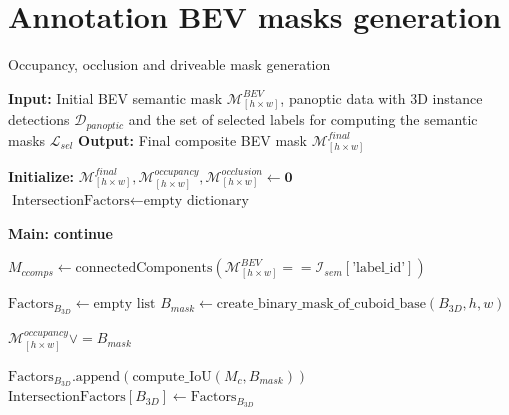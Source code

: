\section{Annotation BEV masks generation} \label{appendix:bev_masks_generation}
\begin{algorithm}
    \caption{Occupancy, occlusion and driveable mask generation}
    \label{algorithm:occ_masks}
    \footnotesize

    \begin{algorithmic}[1]
        \State \textbf{Input:} Initial BEV semantic mask $\mathcal{M}^{BEV}_{\left[h \times w\right]}$, panoptic data with 3D instance detections  $\mathcal{D}_{panoptic}$ and the set of selected labels for computing the semantic masks $\mathcal{L}_{sel}$
        \State \textbf{Output:} Final composite BEV mask $\mathcal{M}^{final}_{\left[h \times w\right]}$
        
        \State \textbf{Initialize:}
        \State $\mathcal{M}^{final}_{\left[h \times w\right]}, \mathcal{M}^{occupancy}_{\left[h \times w\right]}, \mathcal{M}^{occlusion}_{\left[h \times w\right]} \gets \mathbf{0}$
        \State $\text{IntersectionFactors} \gets \text{empty dictionary}$ 
        
        \State \textbf{Main:}        
                \State \textbf{continue}
            \EndIf
        
            \State $M_{ccomps} \gets \text{connectedComponents}(\mathcal{M}^{BEV}_{\left[h \times w\right]} == \mathcal{I}_{sem}[\text{'label\_id'}])$



             
                \State $\text{Factors}_{B_{3D}} \gets \text{empty list}$
                \State $B_{mask} \gets \text{create\_binary\_mask\_of\_cuboid\_base}(B_{3D}, h, w)$
                
                \State $\mathcal{M}^{occupancy}_{\left[h \times w\right]} \lor = B_{mask}$

                    \State $\text{Factors}_{B_{3D}}.\text{append}(\text{compute\_IoU}(M_{c}, B_{mask}))$
                \EndFor
                \State $\text{IntersectionFactors}[B_{3D}] \gets \text{Factors}_{B_{3D}}$
            \EndFor



\end{algorithmic}
\end{algorithm}
